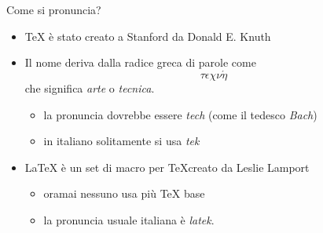 \documentclass{beamer}
\begin{document}

\begin{frame}{Come si pronuncia?}

\begin{itemize}
\item \TeX{} \`e stato creato a Stanford da Donald E. Knuth
\item Il nome deriva dalla radice greca di parole come
\textbf{\Large $$\tau\epsilon\chi\nu\acute{\eta}$$}
che significa \emph{arte} o \emph{tecnica}.
\begin{itemize}
\item la pronuncia dovrebbe essere \emph{tech} (come il tedesco \emph{Bach})
\item in italiano solitamente si usa \emph{tek}
\end{itemize}
\item \LaTeX{} \`e un set di macro per \TeX creato da Leslie Lamport

\begin{itemize}
\item oramai nessuno usa pi\`u \TeX{} base
\item la pronuncia usuale italiana \`e \emph{latek}.
\end{itemize}
\end{itemize}
\end{frame}

\end{document}

